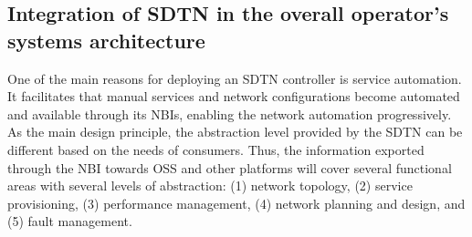 \documentclass[10pt, conference]{IEEEtran}
\begin{document}


\subsection{Integration of SDTN in the overall operator’s systems architecture}
\label{section:sdtn}
One of the main reasons for deploying an SDTN controller is service automation. It facilitates that manual services and network configurations become automated and available through its NBIs, enabling the network automation progressively. As the main design principle, the abstraction level provided by the SDTN can be different based on the needs of consumers. Thus, the information exported through the NBI towards OSS and other platforms will cover several functional areas with several levels of abstraction: (1) network topology, (2) service provisioning, (3) performance management, (4) network planning and design, and (5) fault management. 

\end{document}
